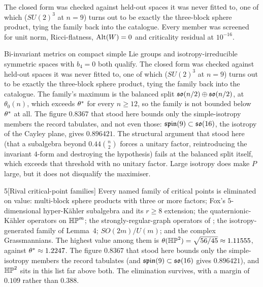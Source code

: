 \begin{certificate}
The closed form was checked against held-out spaces it was never fitted to, one of which ($SU(2)^3$ at $n=9$) turns out to be exactly the three-block sphere product, tying the family back into the catalogue. Every member was screened for unit norm, Ricci-flatness, $\mathrm{Alt}(W)=0$ and criticality residual at $10^{-16}$.
\end{certificate}

Bi-invariant metrics on compact simple Lie groups and isotropy-irreducible symmetric spaces with $b_4=0$ both qualify. The closed form was checked against held-out spaces it was never fitted to, one of which ($SU(2)^3$ at $n=9$) turns out to be exactly the three-block sphere product, tying the family back into the catalogue. The family's maximum is the balanced split $\mathfrak{so}(n/2)\oplus\mathfrak{so}(n/2)$, at $\theta_0(n)$, which exceeds $\theta^{*}$ for every $n\ge12$, so the family is not bounded below $\theta^{*}$ at all. The figure $0.8367$ that stood here bounds only the simple-isotropy members the record tabulates, and not even those: $\mathfrak{spin}(9)\subset\mathfrak{so}(16)$, the isotropy of the Cayley plane, gives $0.896421$. The structural argument that stood here (that a subalgebra beyond $0.44\binom n2$ forces a unitary factor, reintroducing the invariant $4$-form and destroying the hypothesis) fails at the balanced split itself, which exceeds that threshold with no unitary factor. Large isotropy does make $P$ large, but it does not disqualify the maximiser.

\begin{Lem}{5}[Rival critical-point families]
Every named family of critical points is eliminated on value: multi-block sphere products with three or more factors; Fox's $5$-dimensional hyper-K\"ahler subalgebra and its $r\ge8$ extension; the quaternionic-K\"ahler operators on $\mathbb{HP}^m$; the strongly-regular-graph operators of \cite{dgk2022}; the isotropy-generated family of Lemma~4; $SO(2m)/U(m)$; and the complex Grassmannians. The highest value among them is $\theta(\mathbb{HP}^2)=\sqrt{56/45}\approx1.11555$, against $\theta^{*}\approx1.2247$. The figure $0.8367$ that stood here bounds only the simple-isotropy members the record tabulates (and $\mathfrak{spin}(9)\subset\mathfrak{so}(16)$ gives $0.896421$), and $\mathbb{HP}^2$ sits in this list far above both. The elimination survives, with a margin of $0.109$ rather than $0.388$.
\end{Lem}

